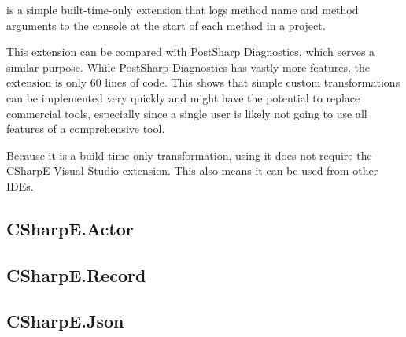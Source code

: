  is a simple built-time-only extension that logs method name and method arguments to the console at the start of each method in a project.

This extension can be compared with PostSharp Diagnostics, \cite{postsharp-diag} which serves a similar purpose. While PostSharp Diagnostics has vastly more features, the extension is only 60 lines of code. This shows that simple custom transformations can be implemented very quickly and might have the potential to replace commercial tools, especially since a single user is likely not going to use all features of a comprehensive tool.


Because it is a build-time-only transformation, using it does not require the CSharpE Visual Studio extension. This also means it can be used from other \acp{IDE}.

\subsection{CSharpE.Actor}


\subsection{CSharpE.Record}

\subsection{CSharpE.Json}